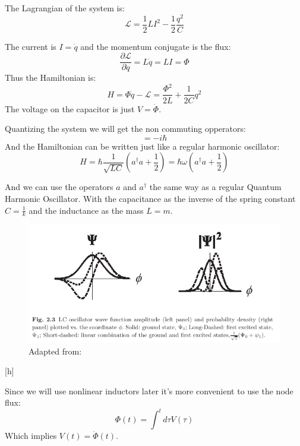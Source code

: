 \documentclass[12pt]{article}
\numberwithin{equation}{subsection}
\newcommand\page[1]{
{
}
}
\begin{document}
The Lagrangian of the system is:
\begin{equation}
    \mathcal L = \frac{1}{2} LI^2 - \frac{1}{2}\frac{q^2}{C}
\end{equation}
\page{8}
The current is $I=\dot q$ and the momentum conjugate is the flux:
\begin{equation}
\frac{\partial \mathcal L}{\partial \dot q} = L\dot q = LI = \Phi
\end{equation}
Thus the Hamiltonian is:
\begin{equation}
    H= \Phi\dot q - \mathcal L = \frac{\Phi^2}{2L} + \frac{1}{2C} q^2
\end{equation}
The voltage on the capacitor is just $V=\dot \Phi$.

Quantizing the system we will get the non commuting opperators:
\begin{equation}
    [\hat \Phi , \hat q] = -i \hbar
\end{equation}
And the Hamiltonian can be written just like a regular harmonic oscillator:
\begin{equation}
    H = \hbar \frac{1}{\sqrt{LC}} (a^\dagger a + \frac{1}{2}) =  \hbar \omega (a^\dagger a + \frac{1}{2})
\end{equation}
\page{9}
And we can use the operators $a$ and $a^\dagger$ the same way as a regular Quantum Harmonic Oscillator. 
With the capacitance as the inverse of the spring constant $C = \frac{1}{k}$ and the inductance as the mass $L=m$. 

\begin{figure}[h]
\includegraphics[scale=3]{images/14-wave-lc.png}
\caption{Adapted from: \cite{Girvin2015CircuitQS}}
\end{figure}[h]

\page{10}

Since we will use nonlinear inductors later it's more convenient to use the node flux:
\begin{equation}
    \Phi(t) = \int ^t d\tau V(\tau)
\end{equation}
Which implies $V(t)= \dot \Phi(t)$.
\end{document}

